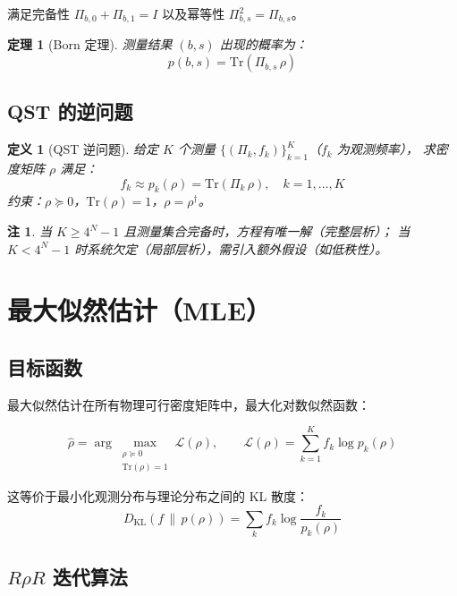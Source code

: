 \documentclass[12pt, a4paper]{article}
\newtheorem{definition}{定义}
\newtheorem{theorem}{定理}
\newtheorem{remark}{注}
\begin{document}
满足完备性 $\Pi_{b,0} + \Pi_{b,1} = I$ 以及幂等性 $\Pi_{b,s}^2 = \Pi_{b,s}$。

\begin{theorem}[Born 定理]
测量结果 $(b, s)$ 出现的概率为：
\[
    p(b,s) = \mathrm{Tr}\!\left(\Pi_{b,s}\,\rho\right)
\]
\end{theorem}

\subsection{QST 的逆问题}

\begin{definition}[QST 逆问题]
给定 $K$ 个测量 $\{(\Pi_k, f_k)\}_{k=1}^K$（$f_k$ 为观测频率），
求密度矩阵 $\rho$ 满足：
\[
    f_k \approx p_k(\rho) = \mathrm{Tr}(\Pi_k\,\rho),
    \quad k = 1, \ldots, K
\]
约束：$\rho \succeq 0$，$\mathrm{Tr}(\rho) = 1$，$\rho = \rho^\dagger$。
\end{definition}

\begin{remark}
当 $K \geq 4^N - 1$ 且测量集合完备时，方程有唯一解（完整层析）；
当 $K < 4^N - 1$ 时系统欠定（局部层析），需引入额外假设（如低秩性）。
\end{remark}

\section{最大似然估计（MLE）}

\subsection{目标函数}

最大似然估计在所有物理可行密度矩阵中，最大化对数似然函数：

\[
    \hat{\rho} = \arg\max_{\substack{\rho \succeq 0 \\ \mathrm{Tr}(\rho)=1}}
    \mathcal{L}(\rho),
    \qquad
    \mathcal{L}(\rho) = \sum_{k=1}^{K} f_k \log p_k(\rho)
\]

这等价于最小化观测分布与理论分布之间的 KL 散度：
\[
    D_{\mathrm{KL}}(f \,\|\, p(\rho))
    = \sum_k f_k \log\frac{f_k}{p_k(\rho)}
\]

\subsection{\texorpdfstring{$R\rho R$}{RρR} 迭代算法}
\end{document}
